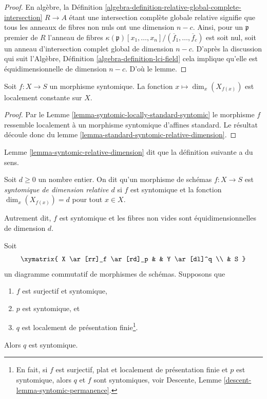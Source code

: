\begin{proof}
En algèbre,
la Définition \ref{algebra-definition-relative-global-complete-intersection} $R \to A$ étant une intersection complète
globale relative signifie que tous les anneaux de
fibres non nuls ont une dimension $n - c$.
Ainsi, pour un $\mathfrak p$ premier de $R$
l'anneau de fibres $\kappa(\mathfrak p)[x_1, \ldots, x_n]/(\overline{f}_1, \ldots, \overline{f}_c)$ est soit nul, soit un anneau d'intersection
complet global de dimension $n - c$. D'après la discussion
qui suit l'Algèbre,
Définition \ref{algebra-definition-lci-field} cela implique qu'elle
est équidimensionnelle de dimension $n - c$. D'où
le lemme.
\end{proof}

\begin{lemma}
\label{lemma-syntomic-relative-dimension}
Soit $f : X \to S$ un morphisme syntomique. La fonction
$x \mapsto \dim_x(X_{f(x)})$ est localement constante sur $X$.
\end{lemma}

\begin{proof}
Par le Lemme \ref{lemma-syntomic-locally-standard-syntomic} le morphisme $f$
ressemble localement à un morphisme
syntomique d'affines standard. Le
résultat découle donc du lemme \ref{lemma-standard-syntomic-relative-dimension}.
\end{proof}

\noindent
Lemme \ref{lemma-syntomic-relative-dimension} dit que la définition
suivante a du sens.

\begin{definition}
\label{definition-syntomic-relative-dimension}
Soit $d \geq 0$ un nombre entier. On dit qu'un morphisme de schémas $f : X \to S$ est {\it
syntomique de dimension relative $d$} si $f$
est syntomique et la fonction $\dim_x(X_{f(x)}) = d$ pour tout $x \in X$.
\end{definition}

\noindent
Autrement dit, $f$ est syntomique et les fibres non vides sont équidimensionnelles de dimension
$d$.

\begin{lemma}
\label{lemma-syntomic-permanence}
Soit
$$
\xymatrix{
X \ar[rr]_f \ar[rd]_p & &
Y \ar[dl]^q \\
& S
}
$$
un diagramme commutatif de morphismes de schémas. Supposons que
\begin{enumerate}
\item $f$ est surjectif et syntomique,
\item $p$ est syntomique, et
\item $q$ est localement de présentation finie\footnote{En fait,
si $f$ est surjectif, plat et localement de présentation finie et $p$
est syntomique, alors $q$ et $f$
sont syntomiques, voir Descente, Lemme \ref{descent-lemma-syntomic-permanence}.}.
\end{enumerate}
Alors $q$ est syntomique.
\end{lemma}

